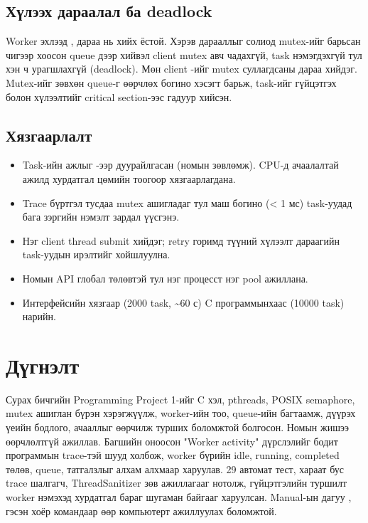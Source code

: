 \documentclass[12pt,a4paper]{article}
\begin{document}
\subsection{Хүлээх дараалал ба deadlock}

Worker эхлээд , дараа нь  хийх ёстой. Хэрэв дарааллыг солиод mutex-ийг барьсан чигээр хоосон queue дээр  хийвэл client mutex авч чадахгүй, task нэмэгдэхгүй тул хэн ч урагшлахгүй (deadlock). Мөн client -ийг mutex суллагдсаны дараа хийдэг. Mutex-ийг зөвхөн queue-г өөрчлөх богино хэсэгт барьж, task-ийг гүйцэтгэх болон хүлээлтийг critical section-ээс гадуур хийсэн.

\subsection{Хязгаарлалт}

\begin{itemize}
  \item Task-ийн ажлыг -ээр дуурайлгасан (номын зөвлөмж). CPU-д ачаалалтай ажилд хурдатгал цөмийн тоогоор хязгаарлагдана.
  \item Trace бүртгэл тусдаа mutex ашигладаг тул маш богино (< 1 мс) task-уудад бага зэргийн нэмэлт зардал үүсгэнэ.
  \item Нэг client thread submit хийдэг; retry горимд түүний хүлээлт дараагийн task-уудын ирэлтийг хойшлуулна.
  \item Номын API глобал төлөвтэй тул нэг процесст нэг pool ажиллана.
  \item Интерфейсийн хязгаар (2000 task, \textasciitilde{}60 с) C программынхаас (10000 task) нарийн.
\end{itemize}

\section{Дүгнэлт}

Сурах бичгийн Programming Project 1-ийг C хэл, pthreads, POSIX semaphore, mutex ашиглан бүрэн хэрэгжүүлж, worker-ийн тоо, queue-ийн багтаамж, дүүрэх үеийн бодлого, ачааллыг өөрчилж турших боломжтой болгосон. Номын  жишээ өөрчлөлтгүй ажиллав. Багшийн оноосон "Worker activity" дүрслэлийг бодит программын trace-тэй шууд холбож, worker бүрийн idle, running, completed төлөв, queue, татгалзлыг алхам алхмаар харуулав. 29 автомат тест, хараат бус trace шалгагч, ThreadSanitizer зөв ажиллагааг нотолж, гүйцэтгэлийн туршилт worker нэмэхэд хурдатгал бараг шугаман байгааг харуулсан. Manual-ын дагуу ,  гэсэн хоёр командаар өөр компьютерт ажиллуулах боломжтой.
\end{document}

